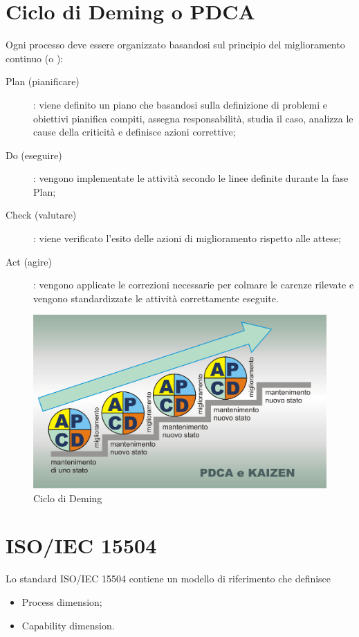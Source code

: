 \documentclass[PianoDiQualifica.tex]{subfiles}
\begin{document}
	\begin{appendices}
		
		\chapter{Ciclo di Deming o PDCA}
		Ogni processo deve essere organizzato basandosi sul principio del miglioramento continuo (o ):
		\begin{description}
			\item [Plan (pianificare)]: viene definito un piano che basandosi sulla definizione di problemi e obiettivi pianifica compiti, assegna responsabilità, studia il caso, analizza le cause della criticità e definisce azioni correttive; 
			\item [Do (eseguire)]: vengono implementate le attività secondo le linee definite durante la fase Plan;
			\item [Check (valutare)]: viene verificato l'esito delle azioni di miglioramento rispetto alle attese;
			\item [Act (agire)]: vengono applicate le correzioni necessarie per colmare le carenze rilevate e vengono standardizzate le attività correttamente eseguite.
		\end{description}
		
		\begin{figure}[htbp]
			\begin{center}
				\includegraphics[width=0.7\linewidth]{PDCAkaizen}
				\caption[Ciclo di Deming]{Ciclo di Deming}
				\label{fig:pdca}
			\end{center}
		\end{figure}
		
		\chapter{ISO/IEC 15504}
		Lo standard ISO/IEC 15504 contiene un modello di riferimento che definisce 
		\begin{itemize}
			\item Process dimension;
			\item Capability dimension.
		\end{itemize}
		

\end{appendices}
\end{document}
